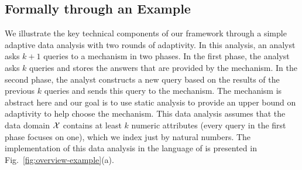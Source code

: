 


\subsection{ {\THESYSTEM} Formally through an Example}
We illustrate the key technical components of our framework through a simple adaptive data analysis with two rounds of adaptivity.
%
In this analysis, an analyst asks $k+1$ queries to a mechanism in two phases.
In the first phase, the analyst asks $k$ queries and stores the answers that are provided by the mechanism. In the second phase, the analyst constructs a new query based on the results of the previous $k$ queries and sends this query to the mechanism. 
The mechanism is abstract here and our goal is to use static analysis to provide an upper bound on adaptivity to help choose the mechanism.
This data analysis assumes that the data domain $\mathcal{X}$ 
contains at least $k$ numeric attributes 
(every query in the first phase focuses on one), which we index just by natural numbers.
The implementation of this data analysis in the language of {\THESYSTEM} is presented in Fig.~\ref{fig:overview-example}(a).

